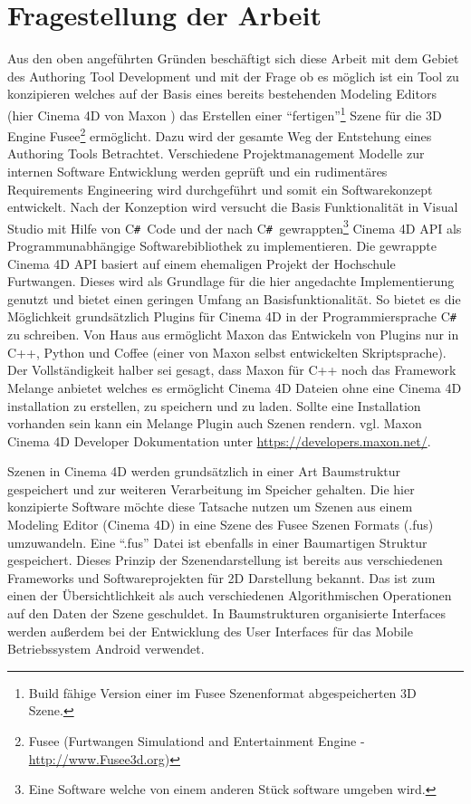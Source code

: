 \documentclass[pagesize, paper=a4, fontsize=12pt, titlepage=true, headings=small, headnosepline, abstractoff, liststotoc, nochapterprefix, plainheadsepline, twoside]{scrreprt}
\newcommand{\CSS}{C\texttt{\# }}
\begin{document}
\section{Fragestellung der Arbeit}
Aus den oben angeführten Gründen beschäftigt sich diese Arbeit mit dem Gebiet des Authoring Tool Development und mit der Frage ob es möglich ist ein Tool zu konzipieren welches auf der Basis eines bereits bestehenden Modeling Editors (hier Cinema 4D von Maxon ) das Erstellen einer “fertigen”\footnote{Build fähige Version einer im Fusee Szenenformat abgespeicherten 3D Szene.} Szene für die 3D Engine Fusee\footnote{Fusee (Furtwangen Simulationd and Entertainment Engine - \url{http://www.Fusee3d.org})} ermöglicht. Dazu wird der gesamte Weg der Entstehung eines Authoring Tools Betrachtet. Verschiedene Projektmanagement Modelle zur internen Software Entwicklung werden geprüft und ein rudimentäres Requirements Engineering wird durchgeführt und somit ein Softwarekonzept entwickelt. Nach der Konzeption wird versucht die Basis Funktionalität in Visual Studio mit Hilfe von \CSS Code und der nach \CSS gewrappten\footnote{Eine Software welche von einem anderen Stück software umgeben wird.} Cinema 4D API als Programmunabhängige Softwarebibliothek zu implementieren. Die gewrappte Cinema 4D API basiert auf einem ehemaligen Projekt der Hochschule Furtwangen. Dieses wird als Grundlage für die hier angedachte Implementierung genutzt und bietet einen geringen Umfang an Basisfunktionalität. So bietet es die Möglichkeit grundsätzlich Plugins für Cinema 4D in der Programmiersprache \CSS zu schreiben. Von Haus aus ermöglicht Maxon das Entwickeln von Plugins nur in C++, Python und Coffee (einer von Maxon selbst entwickelten Skriptsprache). Der Vollständigkeit halber sei gesagt, dass Maxon für C++ noch das Framework Melange anbietet welches es ermöglicht Cinema 4D Dateien ohne eine Cinema 4D installation zu erstellen, zu speichern und zu laden. Sollte eine Installation vorhanden sein kann ein Melange Plugin auch Szenen rendern. vgl. Maxon Cinema 4D Developer Dokumentation unter \url{https://developers.maxon.net/}.

Szenen in Cinema 4D werden grundsätzlich in einer Art Baumstruktur gespeichert und zur weiteren Verarbeitung im Speicher gehalten. Die hier konzipierte Software möchte diese Tatsache nutzen um Szenen aus einem Modeling Editor (Cinema 4D) in eine Szene des Fusee Szenen Formats (.fus) umzuwandeln. Eine “.fus” Datei ist ebenfalls in einer Baumartigen Struktur gespeichert. Dieses Prinzip der Szenendarstellung ist bereits aus verschiedenen Frameworks und Softwareprojekten für 2D Darstellung bekannt. Das ist zum einen der Übersichtlichkeit als auch verschiedenen Algorithmischen Operationen auf den Daten der Szene geschuldet. In Baumstrukturen organisierte Interfaces werden außerdem bei der Entwicklung des User Interfaces für das Mobile Betriebssystem Android verwendet.
\end{document}
